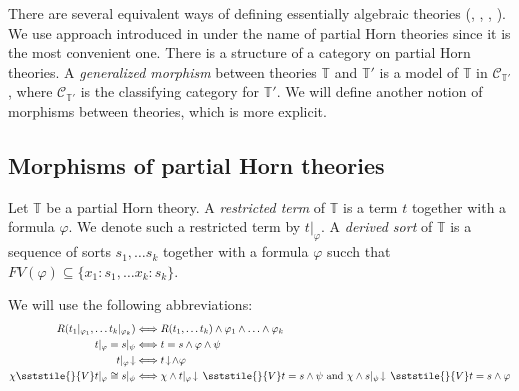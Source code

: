 
There are several equivalent ways of defining essentially algebraic theories (\cite{LPC}, \cite{GAT}, \cite{PHL}, \cite[D 1.3.4]{elephant}).
We use approach introduced in \cite{PHL} under the name of partial Horn theories since it is the most convenient one.
There is a structure of a category on partial Horn theories.
A \emph{generalized morphism} between theories $\mathbb{T}$ and $\mathbb{T}'$ is a model of $\mathbb{T}$ in $\mathcal{C}_{\mathbb{T}'}$,
where $\mathcal{C}_{\mathbb{T}'}$ is the classifying category for $\mathbb{T}'$.
We will define another notion of morphisms between theories, which is more explicit.

\subsection{Morphisms of partial Horn theories}

Let $\mathbb{T}$ be a partial Horn theory.
A \emph{restricted term} of $\mathbb{T}$ is a term $t$ together with a formula $\varphi$.
We denote such a restricted term by $t|_\varphi$.
A \emph{derived sort} of $\mathbb{T}$ is a sequence of sorts $s_1, \ldots s_k$ together with a formula $\varphi$ succh that $FV(\varphi) \subseteq \{ x_1 : s_1, \ldots x_k : s_k \}$.

We will use the following abbreviations:
\begin{align*}
R(t_1|_{\varphi_1}, \ldots t_k|_{\varphi_k}) & \Longleftrightarrow R(t_1, \ldots t_k) \land \varphi_1 \land \ldots \land \varphi_k \\
t|_\varphi = s|_\psi & \Longleftrightarrow t = s \land \varphi \land \psi \\
t|_\varphi\!\downarrow & \Longleftrightarrow t\!\downarrow\!\land \varphi \\
\chi \sststile{}{V} t|_\varphi \cong s|_\psi & \Longleftrightarrow \chi \land t|_\varphi\!\downarrow\,\sststile{}{V} t = s \land \psi \text{ and } \chi \land s|_\psi\!\downarrow\,\sststile{}{V} t = s \land \varphi
\end{align*}

